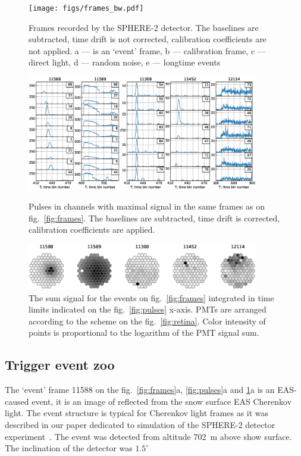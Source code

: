 \documentclass[final,5p,times,twocolumn]{elsarticle}
\begin{document}
\begin{figure}[btp]
\centering
\texttt{[image: figs/frames\_bw.pdf]}
\caption{Frames recorded by the SPHERE-2 detector. The baselines are subtracted, time drift is not corrected, calibration coefficients are not applied. a --- is an `event' frame, b --- calibration frame, c --- direct light, d --- random noise, e --- longtime events}
\label{fig:frames}

\includegraphics[width=0.9\textwidth]{figs/pulses.eps}%
\caption{Pulses in channels with maximal signal in the same frames as on fig.~\ref{fig:frames}. The baselines are subtracted, time drift is corrected, calibration coefficients are applied.}
\label{fig:pulses}
\vspace{1.2pc}
\includegraphics[width=0.9\textwidth]{figs/mosaic_sums_lin.eps}%
\vspace{-1.0pc}
\caption{The sum signal for the events on fig.~\ref{fig:frames} integrated in time limits indicated on the fig.~\ref{fig:pulses} x-axis. PMTs are arranged according to the scheme on the fig.~\ref{fig:retina}. Color intensity of points is proportional to the logarithm of the PMT signal sum.}
\label{fig:mosaic_sum}
\end{figure}

\subsection{Trigger event zoo}

The `event' frame 11588 on the fig.~\ref{fig:frames}a, \ref{fig:pulses}a and \ref{fig:mosaic_sum}a is an EAS-caused event, it is an image of reflected from the snow surface EAS Cherenkov light. The event structure is typical for Cherenkov light frames as it was described in our paper dedicated to simulation of the SPHERE-2 detector experiment~\cite{Ant19}. The event was detected from altitude 702~m above show surface. The inclination of the detector was $1.5^{\circ}$
\end{document}

